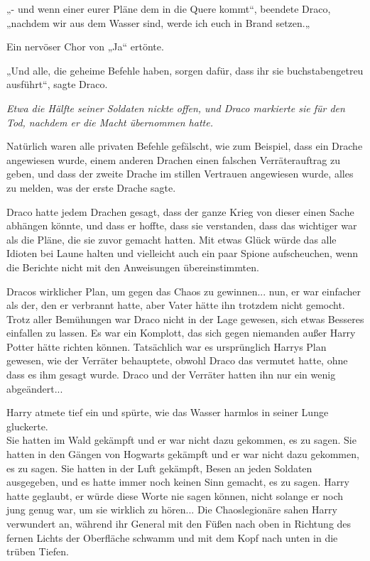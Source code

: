 {„- und wenn einer eurer Pläne dem in die Quere kommt“, beendete Draco, „nachdem wir aus dem Wasser sind, werde ich euch in Brand setzen.„

Ein nervöser Chor von „Ja“ ertönte.

„Und alle, die geheime Befehle haben, sorgen dafür, dass ihr sie buchstabengetreu ausführt“, sagte Draco.

\emph{Etwa die Hälfte seiner Soldaten nickte offen, und Draco markierte sie für den Tod, nachdem er die Macht übernommen hatte.}

Natürlich waren alle privaten Befehle gefälscht, wie zum Beispiel, dass ein Drache angewiesen wurde, einem anderen Drachen einen falschen Verräterauftrag zu geben, und dass der zweite Drache im stillen Vertrauen angewiesen wurde, alles zu melden, was der erste Drache sagte.

Draco hatte jedem Drachen gesagt, dass der ganze Krieg von dieser einen Sache abhängen könnte, und dass er hoffte, dass sie verstanden, dass das wichtiger war als die Pläne, die sie zuvor gemacht hatten. Mit etwas Glück würde das alle Idioten bei Laune halten und vielleicht auch ein paar Spione aufscheuchen, wenn die Berichte nicht mit den Anweisungen übereinstimmten.

Dracos wirklicher Plan, um gegen das Chaos zu gewinnen... nun, er war einfacher als der, den er verbrannt hatte, aber Vater hätte ihn trotzdem nicht gemocht.\\ Trotz aller Bemühungen war Draco nicht in der Lage gewesen, sich etwas Besseres einfallen zu lassen. Es war ein Komplott, das sich gegen niemanden außer Harry Potter hätte richten können. Tatsächlich war es ursprünglich Harrys Plan gewesen, wie der Verräter behauptete, obwohl Draco das vermutet hatte, ohne dass es ihm gesagt wurde. Draco und der Verräter hatten ihn nur ein wenig abgeändert...

Harry atmete tief ein und spürte, wie das Wasser harmlos in seiner Lunge gluckerte.\\ Sie hatten im Wald gekämpft und er war nicht dazu gekommen, es zu sagen. Sie hatten in den Gängen von Hogwarts gekämpft und er war nicht dazu gekommen, es zu sagen. Sie hatten in der Luft gekämpft, Besen an jeden Soldaten ausgegeben, und es hatte immer noch keinen Sinn gemacht, es zu sagen. Harry hatte geglaubt, er würde diese Worte nie sagen können, nicht solange er noch jung genug war, um sie wirklich zu hören... Die Chaoslegionäre sahen Harry verwundert an, während ihr General mit den Füßen nach oben in Richtung des fernen Lichts der Oberfläche schwamm und mit dem Kopf nach unten in die trüben Tiefen.

}
